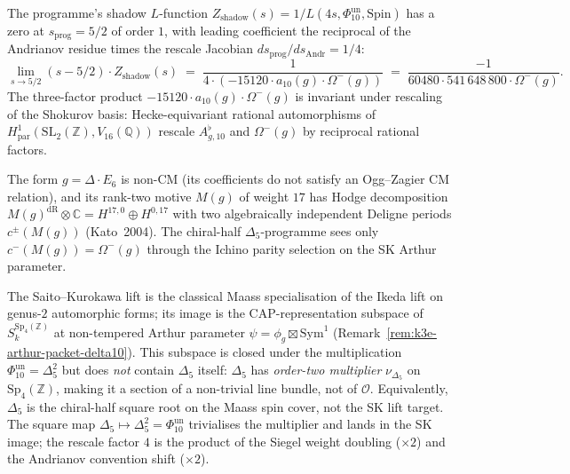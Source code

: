 \begin{remark}[Shadow $Z$ at $s_{\mathrm{prog}} = 5/2$]
\label{rem:k3e-shadow-5-2}
The programme's shadow $L$-function \(Z_{\mathrm{shadow}}(s) = 1/L(4s, \Phi_{10}^{\mathrm{un}}, \mathrm{Spin})\) has a zero at $s_{\mathrm{prog}} = 5/2$ of order $1$, with leading coefficient the reciprocal of the Andrianov residue times the rescale Jacobian $ds_{\mathrm{prog}}/ds_{\mathrm{Andr}} = 1/4$:
\[
 \lim_{s \to 5/2} (s - 5/2) \cdot Z_{\mathrm{shadow}}(s) \;=\; \frac{1}{4 \cdot (-15120 \cdot a_{10}(g) \cdot \Omega^-(g))} \;=\; \frac{-1}{60480 \cdot 541\,648\,800 \cdot \Omega^-(g)}.
\]
The three-factor product $-15120 \cdot a_{10}(g) \cdot \Omega^-(g)$ is invariant under rescaling of the Shokurov basis: Hecke-equivariant rational automorphisms of $H^1_{\mathrm{par}}(\mathrm{SL}_2(\mathbb{Z}), V_{16}(\mathbb{Q}))$ rescale $A^\flat_{g, 10}$ and $\Omega^-(g)$ by reciprocal rational factors.
\end{remark}

\begin{remark}[$g = \Delta \cdot E_6$ is non-CM]
\label{rem:k3e-g-cm-free}
The form $g = \Delta \cdot E_6$ is non-CM (its coefficients do not satisfy an Ogg--Zagier CM relation), and its rank-two motive $M(g)$ of weight $17$ has Hodge decomposition $M(g)^{\mathrm{dR}} \otimes \mathbb{C} = H^{17, 0} \oplus H^{0, 17}$ with two algebraically independent Deligne periods $c^\pm(M(g))$ (Kato~2004). The chiral-half $\Delta_5$-programme sees only $c^-(M(g)) = \Omega^-(g)$ through the Ichino parity selection on the SK Arthur parameter.
\end{remark}

\begin{remark}
\label{rem:k3e-delta5-not-sk-target}
The Saito--Kurokawa lift is the classical Maass specialisation of the Ikeda lift on genus-$2$ automorphic forms; its image is the CAP-representation subspace of $S_k^{\mathrm{Sp}_4(\mathbb{Z})}$ at non-tempered Arthur parameter $\psi = \phi_g \boxtimes \mathrm{Sym}^1$ (Remark~\ref{rem:k3e-arthur-packet-delta10}). This subspace is closed under the multiplication \(\Phi_{10}^{\mathrm{un}}=\Delta_5^2\) but does \emph{not} contain $\Delta_5$ itself: $\Delta_5$ has \emph{order-two multiplier} $\nu_{\Delta_5}$ on $\mathrm{Sp}_4(\mathbb{Z})$, making it a section of a non-trivial line bundle, not of $\mathcal{O}$. Equivalently, $\Delta_5$ is the chiral-half square root on the Maass spin cover, not the SK lift target. The square map \(\Delta_5 \mapsto \Delta_5^2=\Phi_{10}^{\mathrm{un}}\) trivialises the multiplier and lands in the SK image; the rescale factor $4$ is the product of the Siegel weight doubling ($\times 2$) and the Andrianov convention shift ($\times 2$).
\end{remark}

